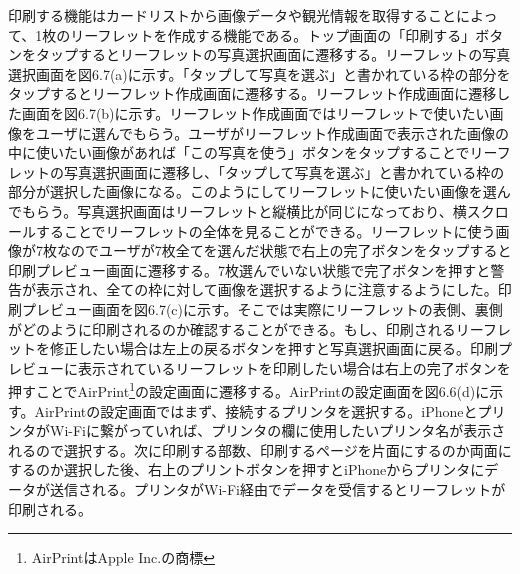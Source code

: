 印刷する機能はカードリストから画像データや観光情報を取得することによって、1枚のリーフレットを作成する機能である。トップ画面の「印刷する」ボタンをタップするとリーフレットの写真選択画面に遷移する。リーフレットの写真選択画面を図6.7(a)に示す。「タップして写真を選ぶ」と書かれている枠の部分をタップするとリーフレット作成画面に遷移する。リーフレット作成画面に遷移した画面を図6.7(b)に示す。リーフレット作成画面ではリーフレットで使いたい画像をユーザに選んでもらう。ユーザがリーフレット作成画面で表示された画像の中に使いたい画像があれば「この写真を使う」ボタンをタップすることでリーフレットの写真選択画面に遷移し、「タップして写真を選ぶ」と書かれている枠の部分が選択した画像になる。このようにしてリーフレットに使いたい画像を選んでもらう。写真選択画面はリーフレットと縦横比が同じになっており、横スクロールすることでリーフレットの全体を見ることができる。リーフレットに使う画像が7枚なのでユーザが7枚全てを選んだ状態で右上の完了ボタンをタップすると印刷プレビュー画面に遷移する。7枚選んでいない状態で完了ボタンを押すと警告が表示され、全ての枠に対して画像を選択するように注意するようにした。印刷プレビュー画面を図6.7(c)に示す。そこでは実際にリーフレットの表側、裏側がどのように印刷されるのか確認することができる。もし、印刷されるリーフレットを修正したい場合は左上の戻るボタンを押すと写真選択画面に戻る。印刷プレビューに表示されているリーフレットを印刷したい場合は右上の完了ボタンを押すことでAirPrint\footnote{AirPrintはApple Inc.の商標}の設定画面に遷移する。AirPrintの設定画面を図6.6(d)に示す。AirPrintの設定画面ではまず、接続するプリンタを選択する。iPhoneとプリンタがWi-Fiに繋がっていれば、プリンタの欄に使用したいプリンタ名が表示されるので選択する。次に印刷する部数、印刷するページを片面にするのか両面にするのか選択した後、右上のプリントボタンを押すとiPhoneからプリンタにデータが送信される。プリンタがWi-Fi経由でデータを受信するとリーフレットが印刷される。
